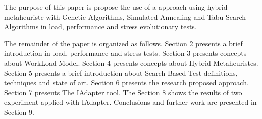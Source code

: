 %
%
%
The purpose of this paper is propose the use of a approach using  hybrid metaheuristc  with  Genetic Algorithms, Simulated Annealing and Tabu Search Algorithms  in load, performance and stress evolutionary tests.

The remainder of the paper is organized as follows. Section 2 presents a brief introduction in load, performance and stress tests. Section 3 presents concepts about WorkLoad Model. Section 4 presents concepts about Hybrid Metaheuristcs. Section 5 presents a brief introduction about Search Based Test definitions, techniques and state of art. Section 6 presents the research proposed approach. Section 7 presents The IAdapter tool. The Section 8 shows the results of two experiment applied with IAdapter. Conclusions and further work are presented in Section 9.